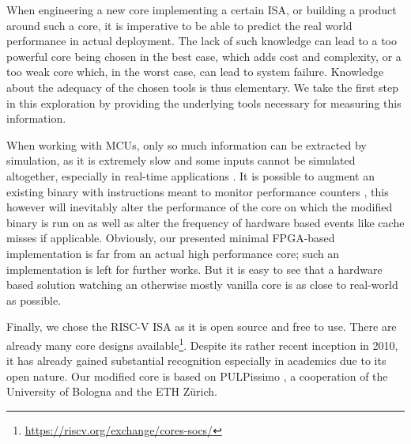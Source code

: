 \documentclass[../bachelor_paper.tex]{subfiles}
\begin{document}
When engineering a new core implementing a certain \ac{ISA}, or building a product around such a core, it is imperative to be able to predict the real world performance in actual deployment. The lack of such knowledge can lead to a too powerful core being chosen in the best case, which adds cost and complexity, or a too weak core which, in the worst case, can lead to system failure. Knowledge about the adequacy of the chosen tools is thus elementary. We take the first step in this exploration by providing the underlying tools necessary for measuring this information.

When working with \ac{MCU}s, only so much information can be extracted by simulation, as it is extremely slow \cite{eeckhoutDesigningComputerArchitecture2003,kaoHardwareApproachRealTime2007} and some inputs cannot be simulated altogether, especially in real-time applications \cite{kaoHardwareApproachRealTime2007}. It is possible to augment an existing binary with instructions meant to monitor performance counters \cite{eeckhoutQuantifyingImpactInput}, this however will inevitably alter the performance of the core on which the modified binary is run on as well as alter the frequency of hardware based events like cache misses if applicable. Obviously, our presented minimal FPGA-based implementation is far from an actual high performance core; such an implementation is left for further works. But it is easy to see that a hardware based solution watching an otherwise mostly vanilla core is as close to real-world as possible.

Finally, we chose the RISC-V ISA \cite{RISCVTechnicalSpecification} as it is open source and free to use. There are already many core designs available\footnote{\url{https://riscv.org/exchange/cores-socs/}}. Despite its rather recent inception in 2010, it has already gained substantial recognition especially in academics due to its open nature. Our modified core is based on PULPissimo \cite{GitHubPulpplatformPulpissimo2021}, a cooperation of the University of Bologna and the ETH Z\"urich.
\end{document}
